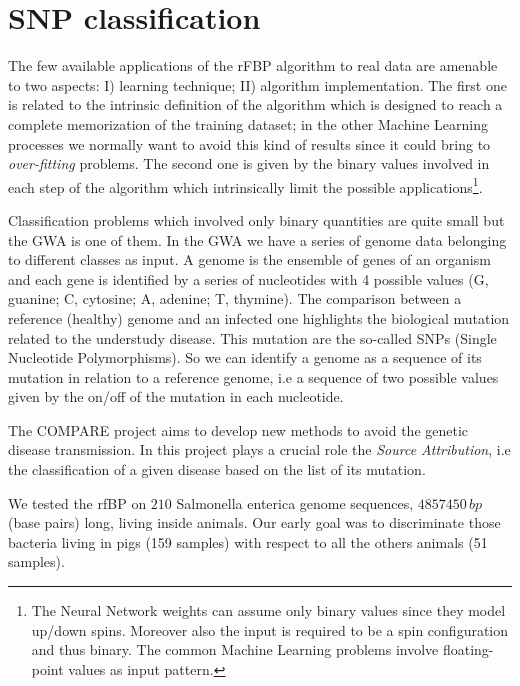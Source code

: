 \documentclass{standalone}
\begin{document}
\section[Compare dataset]{SNP classification}\label{rfbp:snp}

The few available applications of the rFBP algorithm to real data are amenable to two aspects: I) learning technique; II) algorithm implementation.
The first one is related to the intrinsic definition of the algorithm which is designed to reach a complete memorization of the training dataset; in the other Machine Learning processes we normally want to avoid this kind of results since it could bring to \emph{over-fitting} problems.
The second one is given by the binary values involved in each step of the algorithm which intrinsically limit the possible applications\footnote{
  The Neural Network weights can assume only binary values since they model up/down spins.
  Moreover also the input is required to be a spin configuration and thus binary.
  The common Machine Learning problems involve floating-point values as input pattern.
}.


Classification problems which involved only binary quantities are quite small but the GWA is one of them.
In the GWA we have a series of genome data belonging to different classes as input.
A genome is the ensemble of genes of an organism and each gene is identified by a series of nucleotides with 4 possible values (G, guanine; C, cytosine; A, adenine; T, thymine).
The comparison between a reference (healthy) genome and an infected one highlights the biological mutation related to the understudy disease.
This mutation are the so-called SNPs (Single Nucleotide Polymorphisms).
So we can identify a genome as a sequence of its mutation in relation to a reference genome, i.e a sequence of two possible values given by the on/off of the mutation in each nucleotide.

The COMPARE project aims to develop new methods to avoid the genetic disease transmission.
In this project plays a crucial role the \emph{Source Attribution}, i.e the classification of a given disease based on the list of its mutation.

We tested the rfBP on $210$ Salmonella enterica genome sequences, $4857450\,bp$ (base pairs) long, living inside animals.
Our early goal was to discriminate those bacteria living in pigs (159 samples) with respect to all the others animals (51 samples).
\end{document}
